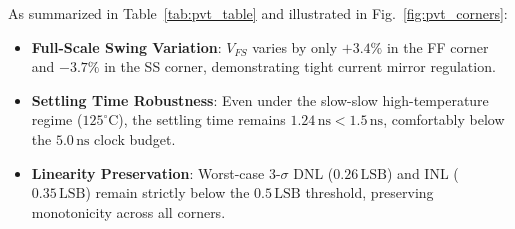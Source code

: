 \documentclass[conference,10pt]{IEEEtran}
\begin{document}
As summarized in Table~\ref{tab:pvt_table} and illustrated in Fig.~\ref{fig:pvt_corners}:
\begin{itemize}
    \item \textbf{Full-Scale Swing Variation}: $V_{FS}$ varies by only $+3.4\%$ in the FF corner and $-3.7\%$ in the SS corner, demonstrating tight current mirror regulation.
    \item \textbf{Settling Time Robustness}: Even under the slow-slow high-temperature regime ($125^\circ\text{C}$), the settling time remains $1.24\,\text{ns} < 1.5\,\text{ns}$, comfortably below the $5.0\,\text{ns}$ clock budget.
    \item \textbf{Linearity Preservation}: Worst-case 3-$\sigma$ DNL ($0.26\,\text{LSB}$) and INL ($0.35\,\text{LSB}$) remain strictly below the $0.5\,\text{LSB}$ threshold, preserving monotonicity across all corners.
\end{itemize}
\end{document}

